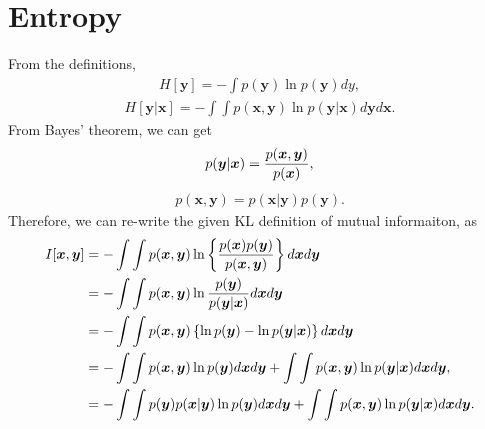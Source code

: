\documentclass[journal,onecolumn,12pt]{IEEEtran}
\begin{document}
\section{Entropy}
From the definitions, 
\begin{equation}
\begin{aligned}
H[\boldsymbol{y}] = - \int p(\boldsymbol{y}) \ln p(\boldsymbol{y}) dy,
\end{aligned}
\label{eq:hx}
\end{equation}
\begin{equation}
\begin{aligned}
H[\boldsymbol{y}|\boldsymbol{x}] = - \int \int p(\boldsymbol{x},\boldsymbol{y}) \ln p(\boldsymbol{y}|\boldsymbol{x}) d\boldsymbol{y} d\boldsymbol{x}.
\end{aligned}
\label{eq:hxy}
\end{equation}
From Bayes' theorem, we can get 
\begin{equation}
\begin{aligned}
p(\boldsymbol{y}|\boldsymbol{x})={{p(\boldsymbol{x},\boldsymbol{y})}\over{p(\boldsymbol{x})}},
\end{aligned}
\end{equation}
\begin{equation}
\begin{aligned}
p(\boldsymbol{x},\boldsymbol{y})={{p(\boldsymbol{x}|\boldsymbol{y})}{p(\boldsymbol{y})}}.
\end{aligned}
\end{equation}
Therefore, we can re-write the given KL definition of mutual informaiton, as
\begin{equation}
\begin{aligned}
I[\boldsymbol{x}, \boldsymbol{y}] &= - \int \int p(\boldsymbol{x}, \boldsymbol{y}) \ln \left\lbrace {{p(\boldsymbol{x}) p(\boldsymbol{y})}\over{p(\boldsymbol{x},\boldsymbol{y})}} \right\rbrace d\boldsymbol{x} d\boldsymbol{y}\\
 &= - \int \int p(\boldsymbol{x}, \boldsymbol{y}) \ln { {p(\boldsymbol{y})} \over {p(\boldsymbol{y}|\boldsymbol{x})} } d\boldsymbol{x} d\boldsymbol{y}\\
 &= - \int \int p(\boldsymbol{x}, \boldsymbol{y}) \left\lbrace \ln p(\boldsymbol{y}) - \ln  {p(\boldsymbol{y}|\boldsymbol{x})} \right\rbrace d\boldsymbol{x} d\boldsymbol{y}\\
 &= - \int \int p(\boldsymbol{x}, \boldsymbol{y}) \ln p(\boldsymbol{y}) d\boldsymbol{x} d\boldsymbol{y} +  \int \int p(\boldsymbol{x},\boldsymbol{y})  \ln  {p(\boldsymbol{y}|\boldsymbol{x})} d\boldsymbol{x} d\boldsymbol{y},\\
 &= - \int \int {p(\boldsymbol{y})} {p(\boldsymbol{x}|\boldsymbol{y})} \ln p(\boldsymbol{y}) d\boldsymbol{x} d\boldsymbol{y} +  \int \int p(\boldsymbol{x},\boldsymbol{y})  \ln {p(\boldsymbol{y}|\boldsymbol{x})} d\boldsymbol{x} d\boldsymbol{y}.
\end{aligned}
\label{eq:hw2form}
\end{equation}
\end{document}

